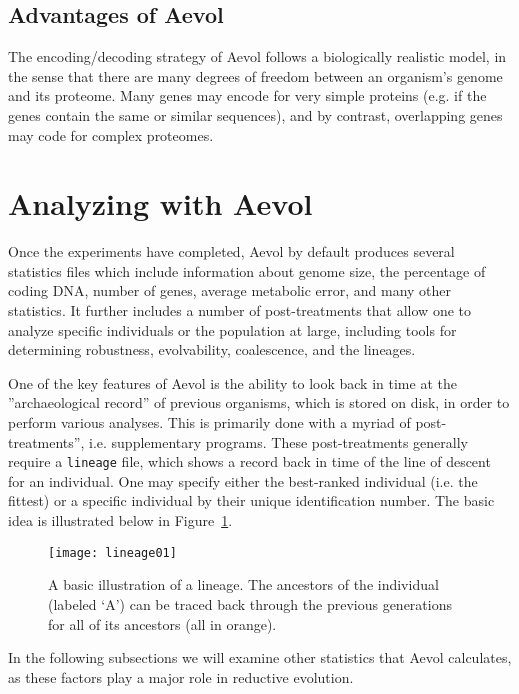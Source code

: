 \subsection{Advantages of Aevol}
The encoding/decoding strategy of Aevol follows a biologically realistic model, in the sense that there are many degrees of freedom between an organism's genome and its proteome. Many genes may encode for very simple proteins (e.g. if the genes contain the same or similar sequences), and by contrast, overlapping genes may code for complex proteomes. 

\section{Analyzing with Aevol}\label{sec:aevol_analysis}

Once the experiments have completed, Aevol by default produces several statistics files which include information about genome size, the percentage of coding DNA, number of genes, average metabolic error, and many other statistics. It further includes a number of post-treatments that allow one to analyze specific individuals or the population at large, including tools for determining robustness, evolvability, coalescence, and the lineages. 

One of the key features of Aevol is the ability to look back in time at the ''archaeological record'' of previous organisms, which is stored on disk, in order to perform various analyses. This is primarily done with a myriad of post-treatments'', i.e. supplementary programs. These post-treatments generally require a \texttt{lineage} file, which shows a record back in time of the line of descent for an individual. One may specify either the best-ranked individual (i.e. the fittest) or a specific individual by their unique identification number. The basic idea is illustrated below in Figure~\ref{fig:lineage01}. 

\begin{figure}[H]
	\texttt{[image: lineage01]}
	\centering
	\caption[Lineage basic illustration.]{A basic illustration of a lineage. The ancestors of the individual (labeled `A') can be traced back through the previous generations for all of its ancestors (all in orange).}
	\label{fig:lineage01}
\end{figure}

In the following subsections we will examine other statistics that Aevol calculates, as these factors play a major role in reductive evolution. 


